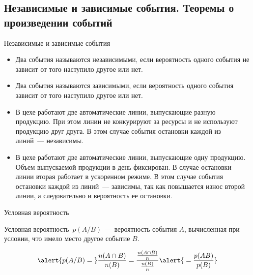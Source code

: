 \documentclass[unicode,11pt,notheorems,xcolor=table]{beamer}
\begin{document}
\subsection{Независимые и зависимые события. Теоремы о произведении событий}
\begin{frame}{Независимые и зависимые события}
    \begin{itemize}
        \item Два события называются \alert{независимыми}, если вероятность одного события не зависит от того наступило другое или нет.
        \item Два события называются \alert{зависимыми}, если вероятность одного события зависит от того наступило другое или нет.
    \end{itemize}
    \begin{itemize}
        \item В цехе работают две автоматические линии, выпускающие разную продукцию. При этом линии не конкурируют за ресурсы и не используют продукцию друг друга. В этом случае события остановки каждой из линий~--- независимы.
        \item В цехе работают две автоматические линии, выпускающие одну продукцию. Объем выпускаемой продукции в день фиксирован. В случае остановки линии вторая работает в ускоренном режиме. В этом случае события остановки каждой из линий~--- зависимы, так как повышается износ второй линии, а следовательно и вероятность ее остановки.
\end{itemize}
\end{frame}
\begin{frame}{Условная вероятность}
    \begin{block}{}
        \alert{Условная вероятность}~\alert{$p(A/B)$}~--- вероятность события $A$, вычисленная при условии, что имело место другое событие $B$. 
    \end{block}
    
    $$
        \alert{p(A/B)={}} \frac{n(A\cap B)}{n(B)} 
        =\frac{\frac{n(A\cap B)}{n}}{\frac{n(B)}{n}}
        \alert{{}=\frac{p(AB)}{p(B)}
        }
    $$
    {\centering 
    \par}

\end{frame}
\end{document}
